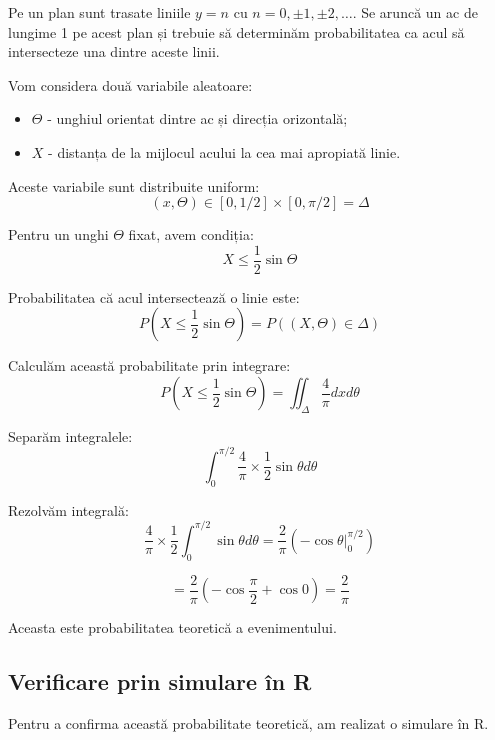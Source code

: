 \documentclass{article}
\begin{document}
Pe un plan sunt trasate liniile \( y = n \) cu \( n = 0, \pm 1, \pm 2, \dots \). Se aruncă un ac de lungime 1 pe acest plan și trebuie să determinăm probabilitatea ca acul să intersecteze una dintre aceste linii. 

Vom considera două variabile aleatoare:
\begin{itemize}
    \item \( \Theta \) - unghiul orientat dintre ac și direcția orizontală;
    \item \( X \) - distanța de la mijlocul acului la cea mai apropiată linie.
\end{itemize}

Aceste variabile sunt distribuite uniform:
\[
(x, \Theta) \in [0, 1/2] \times [0, \pi/2] = \Delta
\]

Pentru un unghi \( \Theta \) fixat, avem condiția:
\[
X \leq \frac{1}{2} \sin \Theta
\]

Probabilitatea că acul intersectează o linie este:
\[
P\left( X \leq \frac{1}{2} \sin \Theta \right) = P\left( (X, \Theta) \in \Delta \right)
\]

Calculăm această probabilitate prin integrare:
\[
P\left( X \leq \frac{1}{2} \sin \Theta \right) = \iint_{\Delta} \frac{4}{\pi} dx d\theta
\]

Separăm integralele:
\[
\int_0^{\pi/2} \frac{4}{\pi} \times \frac{1}{2} \sin \theta d\theta
\]

Rezolvăm integrală:
\[
\frac{4}{\pi} \times \frac{1}{2} \int_0^{\pi/2} \sin \theta d\theta = \frac{2}{\pi} (-\cos \theta \Big|_0^{\pi/2})
\]

\[
= \frac{2}{\pi} ( -\cos \frac{\pi}{2} + \cos 0) = \frac{2}{\pi}
\]

Aceasta este probabilitatea teoretică a evenimentului.

\newpage

\subsection{Verificare prin simulare în R}

Pentru a confirma această probabilitate teoretică, am realizat o simulare în R.
\end{document}
